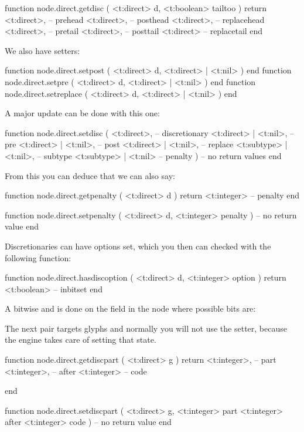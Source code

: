 \starttyping[option=LUA]
function node.direct.getdisc ( <t:direct> d, <t:boolean> tailtoo )
    return
        <t:direct>, -- prehead
        <t:direct>, -- posthead
        <t:direct>, -- replacehead
        <t:direct>, -- pretail
        <t:direct>, -- posttail
        <t:direct>  -- replacetail
end
\stoptyping

We also have setters:

\starttyping[option=LUA]
function node.direct.setpost    ( <t:direct> d, <t:direct> | <t:nil> ) end
function node.direct.setpre     ( <t:direct> d, <t:direct> | <t:nil> ) end
function node.direct.setreplace ( <t:direct> d, <t:direct> | <t:nil> ) end
\stoptyping

A major update can be done with this one:

\starttyping[option=LUA]
function node.direct.setdisc (
    <t:direct>,            -- discretionary
    <t:direct>  | <t:nil>, -- pre
    <t:direct>  | <t:nil>, -- post
    <t:direct>  | <t:nil>, -- replace
    <t:subtype> | <t:nil>, -- subtype
    <t:subtype> | <t:nil>  -- penalty
)
    -- no return values
end
\stoptyping

From this you can deduce that we can also say:

\starttyping[option=LUA]
function node.direct.getpenalty ( <t:direct> d )
    return <t:integer> -- penalty
end

function node.direct.setpenalty ( <t:direct> d, <t:integer> penalty )
    -- no return value
end
\stoptyping

Discretionaries can have options set, which you then can checked with
the following function:

\starttyping[option=LUA]
function node.direct.hasdiscoption ( <t:direct> d, <t:integer> option )
    return <t:boolean> -- inbitset
end
\stoptyping

A bitwise and is done on the field in the node where possible bits are:


The next pair targets glyphs and normally you will not use the setter, because
the engine takes care of setting that state.

\starttyping[option=LUA]
function node.direct.getdiscpart ( <t:direct> g )
    return
        <t:integer>, -- part
        <t:integer>, -- after
        <t:integer>  -- code

end

function node.direct.setdiscpart (
    <t:direct>  g,
    <t:integer> part
    <t:integer> after
    <t:integer> code
)
    -- no return value
end
\stoptyping

